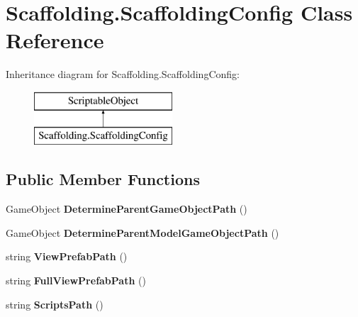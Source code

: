 \hypertarget{class_scaffolding_1_1_scaffolding_config}{\section{Scaffolding.\+Scaffolding\+Config Class Reference}
\label{class_scaffolding_1_1_scaffolding_config}
}
Inheritance diagram for Scaffolding.\+Scaffolding\+Config\+:\begin{figure}[H]
\begin{center}
\leavevmode
\includegraphics[height=2.000000cm]{class_scaffolding_1_1_scaffolding_config}
\end{center}
\end{figure}
\subsection*{Public Member Functions}
\begin{DoxyCompactItemize}
\item 
\hypertarget{class_scaffolding_1_1_scaffolding_config_acfa863fb89c925a686abc89448070cfd}{Game\+Object {\bfseries Determine\+Parent\+Game\+Object\+Path} ()}\label{class_scaffolding_1_1_scaffolding_config_acfa863fb89c925a686abc89448070cfd}

\item 
\hypertarget{class_scaffolding_1_1_scaffolding_config_aa9921a734611ed4e2257196ea9822628}{Game\+Object {\bfseries Determine\+Parent\+Model\+Game\+Object\+Path} ()}\label{class_scaffolding_1_1_scaffolding_config_aa9921a734611ed4e2257196ea9822628}

\item 
\hypertarget{class_scaffolding_1_1_scaffolding_config_a1da269f9448ac11a2de5d109ef6ff380}{string {\bfseries View\+Prefab\+Path} ()}\label{class_scaffolding_1_1_scaffolding_config_a1da269f9448ac11a2de5d109ef6ff380}

\item 
\hypertarget{class_scaffolding_1_1_scaffolding_config_a5cab51db784ed3e5ad6d03e0e741ba8f}{string {\bfseries Full\+View\+Prefab\+Path} ()}\label{class_scaffolding_1_1_scaffolding_config_a5cab51db784ed3e5ad6d03e0e741ba8f}

\item 
\hypertarget{class_scaffolding_1_1_scaffolding_config_a0086bba5ebde8b4b8bca016b2f6de7fe}{string {\bfseries Scripts\+Path} ()}\label{class_scaffolding_1_1_scaffolding_config_a0086bba5ebde8b4b8bca016b2f6de7fe}

\end{DoxyCompactItemize}
